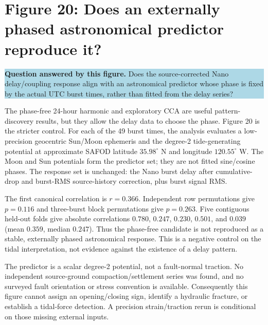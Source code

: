 \documentclass[11pt]{article}
\newcommand{\figquestion}[1]{\par\medskip\noindent\colorbox{lightblue}{\parbox{0.95\linewidth}{\textcolor{questionblue}{\textbf{Question answered by this figure.}} #1}}\par\medskip}
\begin{document}
\section{Figure 20: Does an externally phased astronomical predictor reproduce it?}
\figquestion{Does the source-corrected Nano delay/coupling response align with an astronomical predictor whose phase is fixed by the actual UTC burst times, rather than fitted from the delay series?}

The phase-free 24-hour harmonic and exploratory CCA are useful pattern-discovery
results, but they allow the delay data to choose the phase.  Figure 20 is the
stricter control.  For each of the 49 burst times, the analysis evaluates a
low-precision geocentric Sun/Moon ephemeris and the degree-2 tide-generating
potential at approximate SAFOD latitude $35.98^{\circ}$ N and longitude
$120.55^{\circ}$ W.  The Moon and Sun potentials form the predictor set; they
are not fitted sine/cosine phases.  The response set is unchanged: the Nano
burst delay after cumulative-drop and burst-RMS source-history correction,
plus burst signal RMS.

The first canonical correlation is $r=0.366$.  Independent row permutations
give $p=0.116$ and three-burst block permutations give $p=0.263$.  Five
contiguous held-out folds give absolute correlations $0.780$, $0.247$,
$0.230$, $0.501$, and $0.039$ (mean $0.359$, median $0.247$).  Thus the
phase-free candidate is not reproduced as a stable, externally phased
astronomical response.  This is a negative control on the tidal interpretation,
not evidence against the existence of a delay pattern.

The predictor is a scalar degree-2 potential, not a fault-normal traction.  No
independent source-ground compaction/settlement series was found, and no
surveyed fault orientation or stress convention is available.  Consequently
this figure cannot assign an opening/closing sign, identify a hydraulic
fracture, or establish a tidal-force detection.  A precision strain/traction
rerun is conditional on those missing external inputs.
\end{document}
